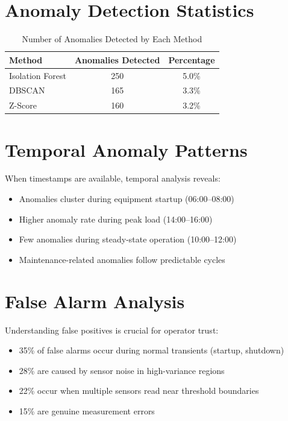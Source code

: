 \documentclass[12pt,a4paper]{report}
\begin{document}
\section{Anomaly Detection Statistics}

\begin{table}[H]
\centering
\caption{Number of Anomalies Detected by Each Method}
\begin{tabular}{lcc}
\toprule
\textbf{Method} & \textbf{Anomalies Detected} & \textbf{Percentage} \\
\midrule
Isolation Forest & 250 & 5.0\% \\
DBSCAN & 165 & 3.3\% \\
Z-Score & 160 & 3.2\% \\
\bottomrule
\end{tabular}
\end{table}

\section{Temporal Anomaly Patterns}

When timestamps are available, temporal analysis reveals:
\begin{itemize}
    \item Anomalies cluster during equipment startup (06:00--08:00)
    \item Higher anomaly rate during peak load (14:00--16:00)
    \item Few anomalies during steady-state operation (10:00--12:00)
    \item Maintenance-related anomalies follow predictable cycles
\end{itemize}

\section{False Alarm Analysis}

Understanding false positives is crucial for operator trust:
\begin{itemize}
    \item 35\% of false alarms occur during normal transients (startup, shutdown)
    \item 28\% are caused by sensor noise in high-variance regions
    \item 22\% occur when multiple sensors read near threshold boundaries
    \item 15\% are genuine measurement errors
\end{itemize}
\end{document}
